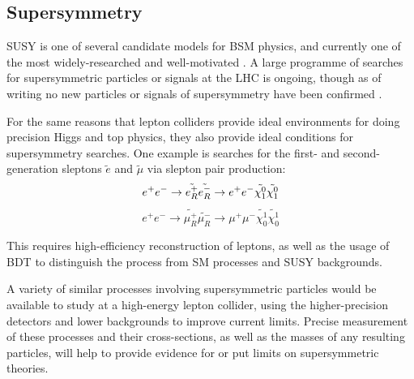 \subsection{Supersymmetry}
\acrfull{SUSY} is one of several candidate models for \acrshort{BSM} physics, and currently one of the most widely-researched and well-motivated \cite{susy-primer}. A large programme of searches for supersymmetric particles or signals at the \acrshort{LHC} is ongoing, though as of writing no new particles or signals of supersymmetry have been confirmed \cite{susy-review} \cite{susy-pt} \cite{susy-dijet}.

For the same reasons that lepton colliders provide ideal environments for doing precision Higgs and top physics, they also provide ideal conditions for supersymmetry searches. One example \cite{slepton-pairs} is searches for the first- and second-generation sleptons $\tilde{e}$ and $\tilde{\mu}$ via slepton pair production:
$$
		e^+ e^- \rightarrow \tilde{e_R^+} \tilde{e_R^-} \rightarrow e^+ e^- \tilde{\chi^0_1} \tilde{\chi^0_1} \\
$$
$$
		e^+ e^- \rightarrow \tilde{\mu_R^+} \tilde{\mu_R^-} \rightarrow \mu^+ \mu^- \tilde{\chi_0^1} \tilde{\chi_0^1}
$$

This requires high-efficiency reconstruction of leptons, as well as the usage of \acrfull{BDT} to distinguish the process from \acrshort{SM} processes and \acrshort{SUSY} backgrounds. 

A variety of similar processes involving supersymmetric particles would be available to study at a high-energy lepton collider, using the higher-precision detectors and lower backgrounds to improve current limits. Precise measurement of these processes and their cross-sections, as well as the masses of any resulting particles, will help to provide evidence for or put limits on supersymmetric theories. %

